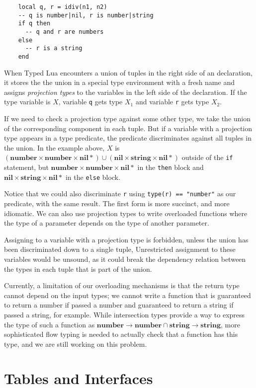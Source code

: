 \documentclass{sig-alternate}
\newcommand{\Nil}{\mathbf{nil}}
\newcommand{\Number}{\mathbf{number}}
\newcommand{\String}{\mathbf{string}}
\begin{document}
\begin{verbatim}
    local q, r = idiv(n1, n2)
    -- q is number|nil, r is number|string
    if q then
      -- q and r are numbers
    else
      -- r is a string
    end
\end{verbatim}

When Typed Lua encounters a union of tuples in the right side
of an declaration, it stores the the union in a special type
environment with a fresh name and assigns {\em projection types} 
to the variables in the left side of the declaration. If the type
variable is $X$, variable {\tt q} gets type $X_1$ and variable
{\tt r} gets type $X_2$.

If we need to check a projection type
against some other type, we take the union of the corresponding
component in each tuple. But if a variable with a projection
type appears in a type predicate, the predicate discriminates
against all tuples in the union. In the example above,
$X$ is $(\Number \times \Number \times \Nil *) \cup
(\Nil \times \String \times \Nil *)$ outside of the {\tt if}
statement, but $\Number \times \Number \times \Nil *$ in the
{\tt then} block and $\Nil \times \String \times \Nil *$ in
the {\tt else} block.

Notice that we could also discriminate {\tt r} using
{\tt type(r) == "number"} as our predicate, with the same
result. The first form is more succinct, and more idiomatic.
We can also use projection types to write overloaded functions
where the type of a parameter depends on the type of another
parameter.

Assigning to a variable with a projection type is forbidden,
unless the union has been discriminated down to a single tuple,
Unrestricted assignment to these variables would be unsound,
as it could break the dependency relation between the types
in each tuple that is part of the union.

Currently, a limitation of our overloading mechanisms is that
the return type cannot depend on the input types; we cannot
write a function that is guaranteed to return a number if
passed a number and guaranteed to return a string if passed
a string, for example. While intersection types provide
a way to express the type of such a function as $\Number 
\rightarrow \Number \cap \String \rightarrow \String$,
more sophisticated flow typing is needed to actually check
that a function has this type, and we are still working on this
problem.

\section{Tables and Interfaces}
\label{sec:tables}
\end{document}
